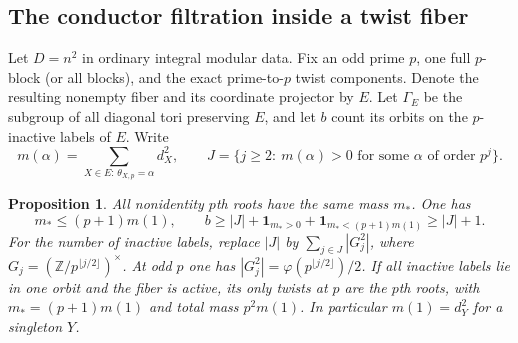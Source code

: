 \documentclass[11pt,a4paper]{article}
\numberwithin{equation}{section}
\newtheorem{proposition}[theorem]{Proposition}
\theoremstyle{remark}
\begin{document}
\subsection{The conductor filtration inside a twist fiber}\label{found:F:3}
Let $D=n^2$ in ordinary integral modular data. Fix an odd prime $p$,
one full $p$-block (or all blocks), and the exact prime-to-$p$ twist
components. Denote the resulting nonempty fiber and its coordinate
projector by $E$. Let $\Gamma_E$ be the subgroup of all diagonal
tori preserving $E$, and let $b$ count its orbits on the $p$-inactive
labels of $E$. Write
\[
 m(\alpha)=\sum_{X\in E:\,\theta_{X,p}=\alpha}d_X^2,\qquad
 J=\{j\ge2:\ m(\alpha)>0\text{ for some $\alpha$ of order }p^j\}.
\]
\begin{proposition}\label{found:F:3.1}\label{found:F:key:pr:low-conductor}\label{found:J:4.3}\label{found:J:key:prop:inactive-multiplicity}
All nonidentity $p$th roots have the same mass $m_*$. One has
\[
  m_*\le(p+1)m(1),\qquad
  b\ge |J|+\mathbf1_{m_*>0}
            +\mathbf1_{m_*<(p+1)m(1)}\ge |J|+1 .
\]
For the number of inactive labels, replace $|J|$ by
$\sum_{j\in J}|G_j^2|$, where $G_j=(\mathbb Z/p^{\lfloor j/2\rfloor})^\times$.
At odd $p$ one has $|G_j^2|=\varphi(p^{\lfloor j/2\rfloor})/2$.
If all inactive labels lie in one orbit and the fiber is active, its only
twists at $p$ are the $p$th roots, with $m_*=(p+1)m(1)$ and total
mass $p^2 m(1)$. In particular $m(1)=d_Y^2$ for a singleton $Y$.
\end{proposition}
\end{document}
